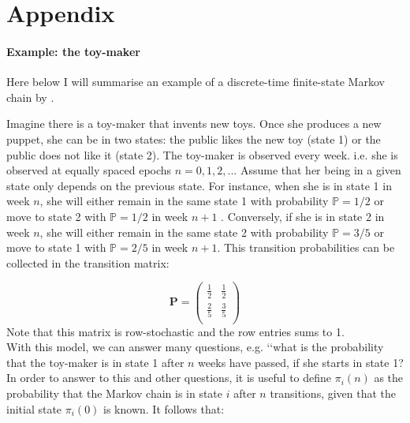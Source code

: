 \documentclass[\main/main.tex]{subfiles}
\begin{document}
\chapter{Appendix}



\subsubsection{Example: the toy-maker \citep{Howard1960}}\label{toy-maker1}

Here below I will summarise an example of a discrete-time finite-state Markov chain by \cite{Howard1960}.\\

\begin{small}
Imagine there is a toy-maker that invents new toys. Once she produces a new puppet, she can be in two states: the public likes the new toy (state 1) or the public does not like it (state 2). The toy-maker is observed every week. i.e. she is observed at equally spaced epochs $n = 0, 1,2,..$.
Assume that her being in a given state only depends on the previous state. For instance, when she is in state 1 in week $n$, she will either remain in the same state 1 with probability $\mathds{P} = 1/2$ or move to state 2 with $\mathds{P} = 1/2$ in week $n+1$  . Conversely, if she is in state 2 in week $n$, she will either remain in the same state 2 with probability $\mathds{P} = 3/5$ or move to state 1 with $\mathds{P} = 2/5$ in week $n+1$. This transition probabilities can be collected in the transition matrix:


\begin{equation*}
\mathbf{P} =
\begin{pmatrix}
\frac{1}{2} &  \frac{1}{2}\\
\frac{2}{5} &  \frac{3}{5}\\
\end{pmatrix}
\end{equation*}
Note that this matrix is row-stochastic and the row entries sums to 1.\\

With this model, we can answer many questions, e.g. \lq\lq what is the probability that the toy-maker is in state 1 after $n$ weeks have passed, if she starts in state 1?\\

In order to answer to this and other questions, it is useful to define $\pi_i(n)$ as the probability that the Markov chain is in state $i$ after $n$ transitions, given that the initial state $\pi_i(0)$ is known. It follows that:


\end{small}
\end{document}
